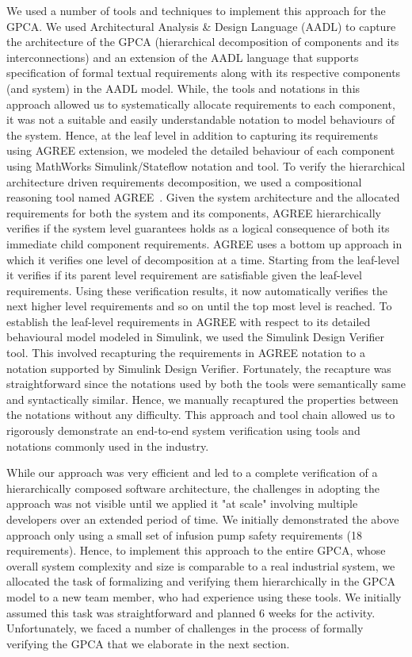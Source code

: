 We used a number of tools and techniques to implement this approach for the GPCA. We used Architectural Analysis \& Design Language (AADL) to capture the architecture of the GPCA (hierarchical decomposition of components and its interconnections) and an extension of the AADL language that supports specification of formal textual requirements along with its respective components (and system) in the AADL model. While, the tools and notations in this approach allowed us to systematically allocate requirements to each component, it was not a suitable and easily understandable notation to model behaviours of the system. Hence, at the leaf level in addition to capturing its requirements using AGREE extension, we modeled the detailed behaviour of each component using MathWorks Simulink/Stateflow notation and tool. To verify the hierarchical architecture driven requirements decomposition, we used a compositional reasoning tool named AGREE~\cite{NFM2012:CoGaMiWhLaLu}. Given the system architecture and the allocated requirements for both the system and its components, AGREE hierarchically verifies if the system level guarantees holds as a logical consequence of both its immediate child component requirements. AGREE uses a bottom up approach in which it verifies one level of decomposition at a time. Starting from the leaf-level it verifies if its parent level requirement are satisfiable given the leaf-level requirements. Using these verification results, it now automatically verifies the next higher level requirements and so on until the top most level is reached. To establish the leaf-level requirements in AGREE with respect to its detailed behavioural model modeled in Simulink, we used the Simulink Design Verifier tool. This involved recapturing the requirements in AGREE notation to a notation supported by Simulink Design Verifier. Fortunately, the recapture was straightforward since the notations used by both the tools were semantically same and syntactically similar. Hence, we manually recaptured the properties between the notations without any difficulty. This approach and tool chain allowed us to rigorously demonstrate an end-to-end system verification using tools and notations commonly used in the industry.

While our approach was very efficient and led to a complete verification of a hierarchically composed software architecture, the challenges in adopting the approach was not visible until we applied it "at scale" involving multiple developers over an extended period of time. We initially demonstrated the above approach only using a small set of infusion pump safety requirements (18 requirements). Hence, to implement this approach to the entire GPCA, whose overall system complexity and size is comparable to a real industrial system, we allocated the task of formalizing and verifying them hierarchically in the GPCA model to a new team member, who had experience using these tools. We initially assumed this task was straightforward and planned 6 weeks for the activity. Unfortunately, we faced a number of challenges in the process of formally verifying the GPCA that we elaborate in the next section.


